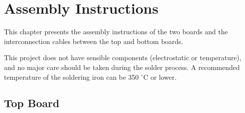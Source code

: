 %
%
%
%
%

%
%
%
%
%
%

\chapter{Assembly Instructions} \label{ch:assembly}

This chapter presents the assembly instructions of the two boards and the interconnection cables between the top and bottom boards.

This project does not have sensible components (electrostatic or temperature), and no major care should be taken during the solder process. A recommended temperature of the soldering iron can be 350 $^{\circ}$C or lower.

\section{Top Board}

